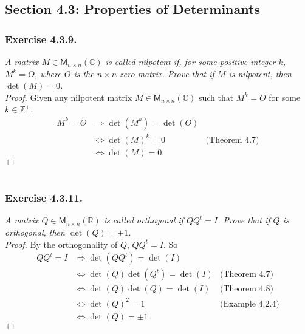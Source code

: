 \documentclass{article}
\begin{document}



\subsection*{Section 4.3: Properties of Determinants \\}



\subsubsection*{Exercise 4.3.9.}
\emph{A matrix $M \in \mathsf{M}_{n \times n}(\mathbb{C})$
is called nilpotent if,
for some positive integer $k$, $M^k = O$, where $O$ is the $n \times n$ zero matrix.
Prove that if $M$ is nilpotent, then $\det(M) = 0$.} \\

\emph{Proof.}
Given any nilpotent matrix $M \in \mathsf{M}_{n \times n}(\mathbb{C})$
such that $M^k = O$ for some $k \in \mathbb{Z}^+$.
\begin{align*}
M^k = O
&\Longrightarrow
\det(M^k) = \det(O) \\
&\Longleftrightarrow
\det(M)^k = 0
  &\text{(Theorem 4.7)} \\
&\Longleftrightarrow
\det(M) = 0.
\end{align*}
$\Box$ \\\\






\subsubsection*{Exercise 4.3.11.}
\emph{A matrix $Q \in \mathsf{M}_{n \times n}(\mathbb{R})$
is called orthogonal if $QQ^t = I$.
Prove that if $Q$ is orthogonal, then $\det(Q) = \pm 1$.} \\

\emph{Proof.}
By the orthogonality of $Q$, $QQ^t = I$. So
\begin{align*}
QQ^t = I
&\Longrightarrow
\det(QQ^t) = \det(I) \\
&\Longleftrightarrow
\det(Q)\det(Q^t) = \det(I)
  &\text{(Theorem 4.7)} \\
&\Longleftrightarrow
\det(Q)\det(Q) = \det(I)
  &\text{(Theorem 4.8)} \\
&\Longleftrightarrow
\det(Q)^2 = 1
  &\text{(Example 4.2.4)} \\
&\Longleftrightarrow
\det(Q) = \pm 1.
\end{align*}
$\Box$ \\\\
\end{document}
